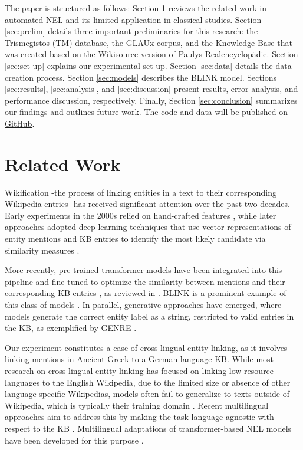 \documentclass[final]{anthology-ch}
\begin{document}
The paper is structured as follows: Section \ref{sec:related_work} reviews the related work in automated NEL and its limited application in classical studies. Section \ref{sec:prelim} details three important preliminaries for this research: the Trismegistos (TM) database, the GLAUx corpus, and the Knowledge Base that was created based on the Wikisource version of Paulys Realencyclopädie. Section \ref{sec:set-up} explains our experimental set-up. Section \ref{sec:data} details the data creation process. Section \ref{sec:models} describes the BLINK model. Sections \ref{sec:results}, \ref{sec:analysis}, and \ref{sec:discussion} present results, error analysis, and performance discussion, respectively. Finally, Section \ref{sec:conclusion} summarizes our findings and outlines future work. The code and data will be published on \href{https://github.com/MarijkeBeersmans/CHR_code_Greek_NEL.git}{GitHub}.

\section{Related Work}\label{sec:related_work}
Wikification -the process of linking entities in a text to their corresponding Wikipedia entries- has received significant attention over the past two decades. Early experiments in the 2000s relied on hand-crafted features \cite{bunescu-pasca-2006-using, cucerzan-2007-large}, while later approaches adopted deep learning techniques that use vector representations of entity mentions and KB entries to identify the most likely candidate via similarity measures \cite{yamada-etal-2016-joint}.

More recently, pre-trained transformer models have been integrated into this pipeline and fine-tuned to optimize the similarity between mentions and their corresponding KB entries \cite{yamada_global_2022, chen_improving_2020}, as reviewed in \cite{sevgili_neural_2022}. BLINK is a prominent example of this class of models \cite{Wu_Petroni_Josifoski_Riedel_Zettlemoyer_2020}. In parallel, generative approaches have emerged, where models generate the correct entity label as a string, restricted to valid entries in the KB, as exemplified by GENRE \cite{cao2021autoregressive}.

Our experiment constitutes a case of cross-lingual entity linking, as it involves linking mentions in Ancient Greek to a German-language KB. While most research on cross-lingual entity linking has focused on linking low-resource languages to the English Wikipedia, due to the limited size or absence of other language-specific Wikipedias, models often fail to generalize to texts outside of Wikipedia, which is typically their training domain \cite{fu_design_2020}. Recent multilingual approaches aim to address this by making the task language-agnostic with respect to the KB \cite{botha_entity_2020, tsai_multilingual_2024}. Multilingual adaptations of transformer-based NEL models have been developed for this purpose \cite{Plekhanov_Kassner_Popat_Martin_Merello_Kozlovskii_Dreyer_Cancedda_2023, de_cao_multilingual_2022}.
\end{document}
